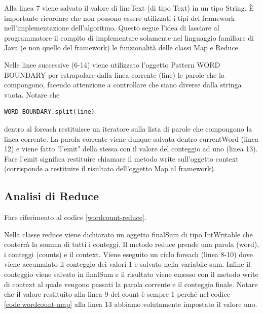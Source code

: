 \documentclass[italian,10pt,a4paper]{report}
\begin{document}
		Alla linea 7 viene salvato il valore di lineText (di tipo Text) in un tipo String. È importante ricordare che non possono essere utilizzati i tipi del framework nell'implementazione dell'algoritmo. Questo segue l'idea di lasciare al programmatore il compito di implementare solamente nel linguaggio familiare di Java (e non quello del framework) le funzionalità delle classi Map e Reduce.
		
		Nelle linee successive (6-14) viene utilizzato l'oggetto Pattern WORD BOUNDARY per estrapolare dalla linea corrente (line) le parole che la compongono, facendo attenzione a controllare che siano diverse dalla stringa vuota. Notare che 
		\begin{lstlisting}[style=java]
			WORD_BOUNDARY.split(line)
		\end{lstlisting}
		dentro al foreach restituisce un iteratore sulla lista di parole che compongono la linea corrente.
		La parola corrente viene dunque salvata dentro currentWord (linea 12) e viene fatto "l'emit" della stessa con il valore del conteggio ad uno (linea 13).
		Fare l'emit significa restituire chiamare il metodo write sull'oggetto context (corrisponde a restituire il risultato dell'oggetto Map al framework).
		
		\subsection{Analisi di Reduce}
		Fare riferimento al codice \ref{wordcount-reduce}.
		
		
		Nella classe reduce viene dichiarato un oggetto finalSum di tipo IntWritable che conterrà la somma di tutti i conteggi. Il metodo reduce prende una parola (word), i conteggi (counts) e il context. Viene eseguito un ciclo foreach (linea 8-10) dove viene accumulato il conteggio dei valori 1 e salvato nella variabile sum. Infine il conteggio viene salvato in finalSum e il risultato viene emesso con il metodo write di context al quale vengono passati la parola corrente e il conteggio finale.
		Notare che il valore restituito alla linea 9 del count è sempre 1 perché nel codice \ref{code:wordcount-map} alla linea 13 abbiamo volutamente impostato il valore uno.
\end{document}

